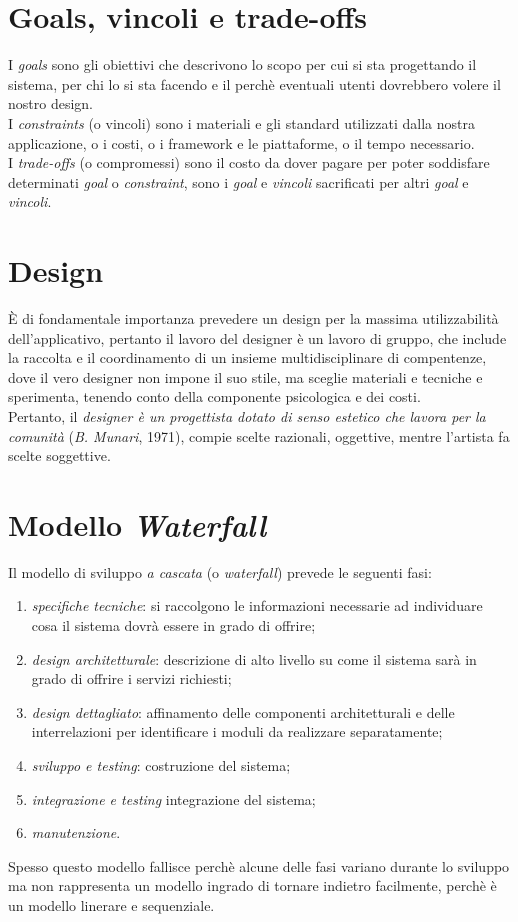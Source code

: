 \section{Goals, vincoli e trade-offs}
I \textit{goals} sono gli obiettivi che descrivono lo scopo per cui si sta progettando il sistema, per chi lo si sta facendo e il perch\`e eventuali utenti dovrebbero volere il nostro design. \\
I \textit{constraints} (o vincoli) sono i materiali e gli standard utilizzati dalla nostra applicazione, o i costi, o i framework e le piattaforme, o il tempo necessario. \\
I \textit{trade-offs} (o compromessi) sono il costo da dover pagare per poter soddisfare determinati \textit{goal} o \textit{constraint}, sono i \textit{goal} e \textit{vincoli} sacrificati per altri \textit{goal} e \textit{vincoli}.

\section{Design}
\`E di fondamentale importanza prevedere un design per la massima utilizzabilit\`a dell'applicativo, pertanto il lavoro del designer \`e un lavoro di gruppo, che include la raccolta e il coordinamento di un insieme multidisciplinare di compentenze, dove il vero designer non impone il suo stile, ma sceglie materiali e tecniche e sperimenta, tenendo conto della componente psicologica e dei costi. \\
Pertanto, il \textit{designer \`e un progettista dotato di senso estetico che lavora per la comunit\`a} (\textit{B. Munari}, 1971), compie scelte razionali, oggettive, mentre l'artista fa scelte soggettive.

\section{Modello \textit{Waterfall}}
Il modello di sviluppo \textit{a cascata} (o \textit{waterfall}) prevede le seguenti fasi:
\begin{enumerate}
	\item \textit{specifiche tecniche}: si raccolgono le informazioni necessarie ad individuare cosa il sistema dovr\`a essere in grado di offrire;
	\item \textit{design architetturale}: descrizione di alto livello su come il sistema sar\`a in grado di offrire i servizi richiesti;
	\item \textit{design dettagliato}: affinamento delle componenti architetturali e delle interrelazioni per identificare i moduli da realizzare separatamente;
	\item \textit{sviluppo e testing}: costruzione del sistema;
	\item \textit{integrazione e testing} integrazione del sistema;
	\item \textit{manutenzione}.
\end{enumerate}
Spesso questo modello fallisce perch\`e alcune delle fasi variano durante lo sviluppo ma non rappresenta un modello ingrado di tornare indietro facilmente, perch\`e \`e un modello linerare e sequenziale.

